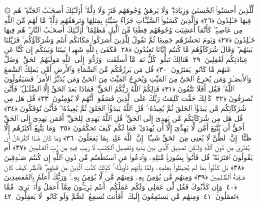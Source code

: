  ۞ لِّلَّذِينَ أَحسَنُوا۟ ٱلحُسنَىٰ وَزِيَادَةٌۭ ۖ وَلَا يَرهَقُ وُجُوهَهُم قَتَرٌۭ وَلَا ذِلَّةٌ ۚ أُو۟لَـٰٓئِكَ أَصحَـٰبُ ٱلجَنَّةِ ۖ هُم فِيهَا خَـٰلِدُونَ ﴿٢٦﴾
 وَٱلَّذِينَ كَسَبُوا۟ ٱلسَّيِّـَٔاتِ جَزَآءُ سَيِّئَةٍۭ بِمِثلِهَا وَتَرهَقُهُم ذِلَّةٌۭ ۖ مَّا لَهُم مِّنَ ٱللَّهِ مِن عَاصِمٍۢ ۖ كَأَنَّمَآ أُغشِيَت وُجُوهُهُم قِطَعًۭا مِّنَ ٱلَّيلِ مُظلِمًا ۚ أُو۟لَـٰٓئِكَ أَصحَـٰبُ ٱلنَّارِ ۖ هُم فِيهَا خَـٰلِدُونَ ﴿٢٧﴾
 وَيَومَ نَحشُرُهُم جَمِيعًۭا ثُمَّ نَقُولُ لِلَّذِينَ أَشرَكُوا۟ مَكَانَكُم أَنتُم وَشُرَكَآؤُكُم ۚ فَزَيَّلنَا بَينَهُم ۖ وَقَالَ شُرَكَآؤُهُم مَّا كُنتُم إِيَّانَا تَعبُدُونَ ﴿٢٨﴾
 فَكَفَىٰ بِٱللَّهِ شَهِيدًۢا بَينَنَا وَبَينَكُم إِن كُنَّا عَن عِبَادَتِكُم لَغَٰفِلِينَ ﴿٢٩﴾
 هُنَالِكَ تَبلُوا۟ كُلُّ نَفسٍۢ مَّآ أَسلَفَت ۚ وَرُدُّوٓا۟ إِلَى ٱللَّهِ مَولَىٰهُمُ ٱلحَقِّ ۖ وَضَلَّ عَنهُم مَّا كَانُوا۟ يَفتَرُونَ ﴿٣٠﴾
 قُل مَن يَرزُقُكُم مِّنَ ٱلسَّمَآءِ وَٱلأَرضِ أَمَّن يَملِكُ ٱلسَّمعَ وَٱلأَبصَـٰرَ وَمَن يُخرِجُ ٱلحَىَّ مِنَ ٱلمَيِّتِ وَيُخرِجُ ٱلمَيِّتَ مِنَ ٱلحَىِّ وَمَن يُدَبِّرُ ٱلأَمرَ ۚ فَسَيَقُولُونَ ٱللَّهُ ۚ فَقُل أَفَلَا تَتَّقُونَ ﴿٣١﴾
 فَذَٟلِكُمُ ٱللَّهُ رَبُّكُمُ ٱلحَقُّ ۖ فَمَاذَا بَعدَ ٱلحَقِّ إِلَّا ٱلضَّلَـٰلُ ۖ فَأَنَّىٰ تُصرَفُونَ ﴿٣٢﴾
 كَذَٟلِكَ حَقَّت كَلِمَتُ رَبِّكَ عَلَى ٱلَّذِينَ فَسَقُوٓا۟ أَنَّهُم لَا يُؤمِنُونَ ﴿٣٣﴾
 قُل هَل مِن شُرَكَآئِكُم مَّن يَبدَؤُا۟ ٱلخَلقَ ثُمَّ يُعِيدُهُۥ ۚ قُلِ ٱللَّهُ يَبدَؤُا۟ ٱلخَلقَ ثُمَّ يُعِيدُهُۥ ۖ فَأَنَّىٰ تُؤفَكُونَ ﴿٣٤﴾
 قُل هَل مِن شُرَكَآئِكُم مَّن يَهدِىٓ إِلَى ٱلحَقِّ ۚ قُلِ ٱللَّهُ يَهدِى لِلحَقِّ ۗ أَفَمَن يَهدِىٓ إِلَى ٱلحَقِّ أَحَقُّ أَن يُتَّبَعَ أَمَّن لَّا يَهِدِّىٓ إِلَّآ أَن يُهدَىٰ ۖ فَمَا لَكُم كَيفَ تَحكُمُونَ ﴿٣٥﴾
 وَمَا يَتَّبِعُ أَكثَرُهُم إِلَّا ظَنًّا ۚ إِنَّ ٱلظَّنَّ لَا يُغنِى مِنَ ٱلحَقِّ شَيـًٔا ۚ إِنَّ ٱللَّهَ عَلِيمٌۢ بِمَا يَفعَلُونَ ﴿٣٦﴾
 وَمَا كَانَ هَـٰذَا ٱلقُرءَانُ أَن يُفتَرَىٰ مِن دُونِ ٱللَّهِ وَلَـٰكِن تَصدِيقَ ٱلَّذِى بَينَ يَدَيهِ وَتَفصِيلَ ٱلكِتَـٰبِ لَا رَيبَ فِيهِ مِن رَّبِّ ٱلعَـٰلَمِينَ ﴿٣٧﴾
 أَم يَقُولُونَ ٱفتَرَىٰهُ ۖ قُل فَأتُوا۟ بِسُورَةٍۢ مِّثلِهِۦ وَٱدعُوا۟ مَنِ ٱستَطَعتُم مِّن دُونِ ٱللَّهِ إِن كُنتُم صَـٰدِقِينَ ﴿٣٨﴾
 بَل كَذَّبُوا۟ بِمَا لَم يُحِيطُوا۟ بِعِلمِهِۦ وَلَمَّا يَأتِهِم تَأوِيلُهُۥ ۚ كَذَٟلِكَ كَذَّبَ ٱلَّذِينَ مِن قَبلِهِم ۖ فَٱنظُر كَيفَ كَانَ عَـٰقِبَةُ ٱلظَّـٰلِمِينَ ﴿٣٩﴾
 وَمِنهُم مَّن يُؤمِنُ بِهِۦ وَمِنهُم مَّن لَّا يُؤمِنُ بِهِۦ ۚ وَرَبُّكَ أَعلَمُ بِٱلمُفسِدِينَ ﴿٤٠﴾
 وَإِن كَذَّبُوكَ فَقُل لِّى عَمَلِى وَلَكُم عَمَلُكُم ۖ أَنتُم بَرِيٓـُٔونَ مِمَّآ أَعمَلُ وَأَنَا۠ بَرِىٓءٌۭ مِّمَّا تَعمَلُونَ ﴿٤١﴾
 وَمِنهُم مَّن يَستَمِعُونَ إِلَيكَ ۚ أَفَأَنتَ تُسمِعُ ٱلصُّمَّ وَلَو كَانُوا۟ لَا يَعقِلُونَ ﴿٤٢﴾
